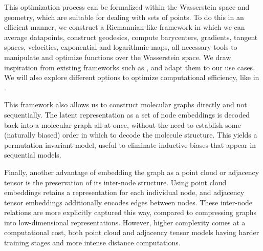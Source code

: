 \documentclass[11pt]{article}
\begin{document}
This optimization process can be formalized within the Wasserstein space and geometry, which are suitable for dealing with sets of points. To do this in an efficient manner, we construct a Riemannian-like framework in which we can average datapoints, construct geodesics, compute barycenters, gradients, tangent spaces, velocities, exponential and logarithmic maps, all necessary tools to manipulate and optimize functions over the Wasserstein space. We draw inspiration from existing frameworks such as \cite{chowdhury2019gromovwasserstein}, and adapt them to our use cases. We will also explore different options to optimize computational efficiency, like in \cite{seguy2015principal, heeren2018principal,cuturi2013fast}.

This framework also allows us to construct molecular graphs directly and not sequentially. The latent representation as a set of node embeddings is decoded back into a molecular graph all at once, without the need to establish some (naturally biased) order in which to decode the molecule structure. This yields a permutation invariant model, useful to eliminate inductive biases that appear in sequential models.

Finally, another advantage of embedding the graph as a point cloud or adjacency tensor is the preservation of its inter-node structure. Using point cloud embeddings retains a representation for each individual node, and adjacency tensor embeddings additionally encodes edges between nodes. These inter-node relations are more explicitly captured this way, compared to compressing graphs into low-dimensional representations. However, higher complexity comes at a computational cost, both point cloud and adjacency tensor models having harder training stages and more intense distance computations.

\medskip


\end{document}
